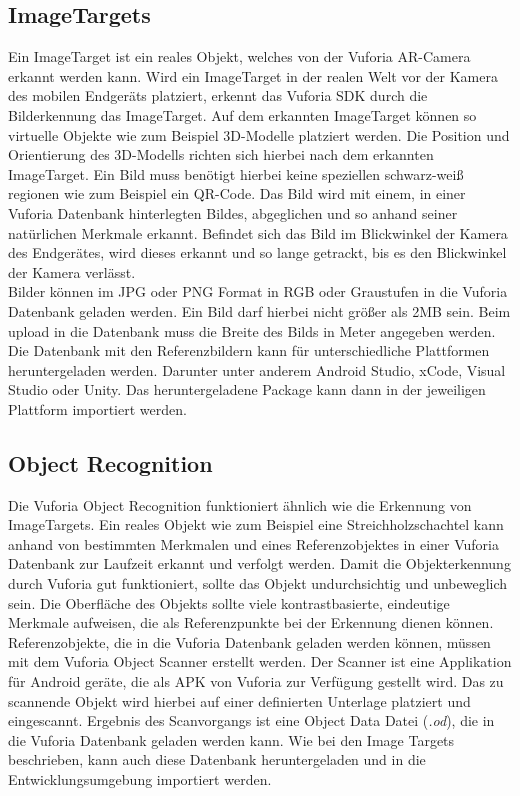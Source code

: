 
\subsection{ImageTargets}
\label{sec:fund_imagetargets}
Ein ImageTarget ist ein reales Objekt, welches von der Vuforia AR-Camera erkannt werden kann. Wird ein ImageTarget in der realen Welt vor der Kamera des mobilen Endgeräts platziert, erkennt das Vuforia SDK durch die Bilderkennung das ImageTarget. Auf dem erkannten ImageTarget können so virtuelle Objekte wie zum Beispiel 3D-Modelle platziert werden. Die Position und Orientierung des 3D-Modells richten sich hierbei nach dem erkannten ImageTarget. 
Ein Bild muss benötigt hierbei keine speziellen schwarz-weiß regionen wie zum Beispiel ein QR-Code. Das Bild wird mit einem, in einer Vuforia Datenbank hinterlegten Bildes, abgeglichen und so anhand seiner natürlichen Merkmale erkannt. Befindet sich das Bild im Blickwinkel der Kamera des Endgerätes, wird dieses erkannt und so lange getrackt, bis es den Blickwinkel der Kamera verlässt.\\
Bilder können im JPG oder PNG Format in RGB oder Graustufen in die Vuforia Datenbank geladen werden. Ein Bild darf hierbei nicht größer als 2MB sein. Beim upload in die Datenbank muss die Breite des Bilds in Meter angegeben werden. Die Datenbank mit den Referenzbildern kann für unterschiedliche Plattformen heruntergeladen werden. Darunter unter anderem Android Studio, xCode, Visual Studio oder Unity. Das heruntergeladene Package kann dann in der jeweiligen Plattform importiert werden.


\subsection{Object Recognition}
Die Vuforia Object Recognition funktioniert ähnlich wie die Erkennung von ImageTargets. Ein reales Objekt wie zum Beispiel eine Streichholzschachtel kann anhand von bestimmten Merkmalen und eines Referenzobjektes in einer Vuforia Datenbank zur Laufzeit erkannt und verfolgt werden. Damit die Objekterkennung durch Vuforia gut funktioniert, sollte das Objekt undurchsichtig und unbeweglich sein. Die Oberfläche des Objekts sollte viele kontrastbasierte, eindeutige Merkmale aufweisen, die als Referenzpunkte bei der Erkennung dienen können.\\
Referenzobjekte, die in die Vuforia Datenbank geladen werden können, müssen mit dem Vuforia Object Scanner  erstellt werden. Der Scanner ist eine Applikation für Android geräte, die als APK von Vuforia zur Verfügung gestellt wird. Das zu scannende Objekt wird hierbei auf einer definierten Unterlage platziert und eingescannt. Ergebnis des Scanvorgangs ist eine Object Data Datei (\textit{.od}), die in die Vuforia Datenbank geladen werden kann. Wie bei den Image Targets beschrieben, kann auch diese Datenbank heruntergeladen und in die Entwicklungsumgebung importiert werden.
